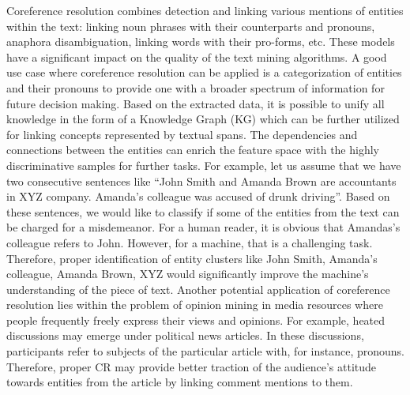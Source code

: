 Coreference resolution combines detection and linking various mentions of entities within the text: linking noun phrases with their counterparts and pronouns, anaphora disambiguation, linking words with their pro-forms, etc.  
These models have a significant impact on the quality of the text mining algorithms. 
A good use case where coreference resolution can be applied is a categorization of entities and their pronouns to provide one with a broader spectrum of information for future decision making. Based on the extracted data, it is possible to unify all knowledge in the form of a Knowledge Graph (KG) \cite{kg-Wang2017} which can be further utilized for linking concepts represented by textual spans. The dependencies and connections between the entities can enrich the feature space with the highly discriminative samples for further tasks. 
For example, let us assume that we have two consecutive sentences like “John Smith and Amanda Brown are accountants in XYZ company. Amanda’s colleague was accused of drunk driving”. Based on these sentences, we would like to classify if some of the entities from the text can be charged for a misdemeanor. 
For a human reader, it is obvious that Amandas’s colleague refers to John. However, for a machine, that is a challenging task. Therefore, proper identification of entity clusters like {John Smith, Amanda’s colleague}, {Amanda Brown}, {XYZ} would significantly improve the machine’s understanding of the piece of text.
Another potential application of coreference resolution lies within the problem of opinion mining in media resources where people frequently freely express their views and opinions.
For example, heated discussions may emerge under political news articles. In these discussions, participants refer to subjects of the particular article with, for instance, pronouns. Therefore, proper CR may provide better traction of the audience's attitude towards entities from the article by linking comment mentions to them.  


